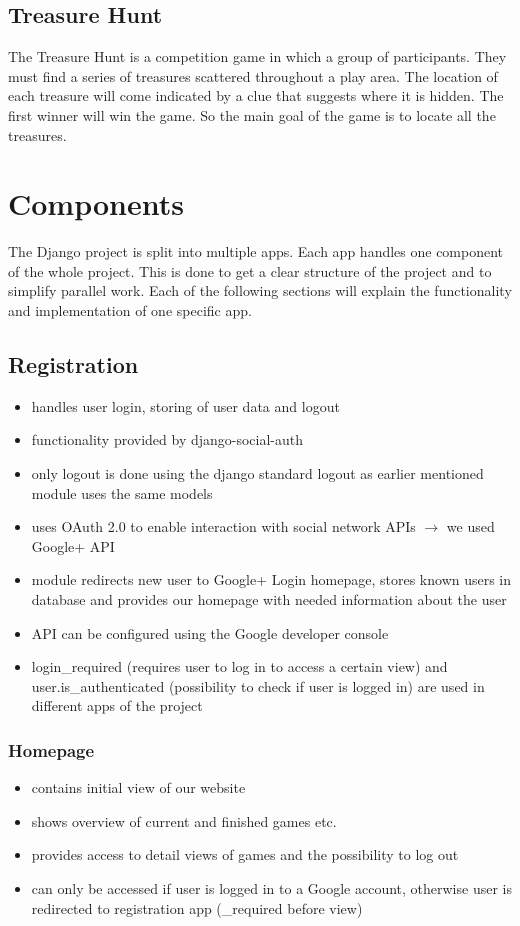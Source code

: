 \documentclass{article}
\begin{document}
\subsection{Treasure Hunt}

The Treasure Hunt is a competition game in which a group of participants. They must find a series of treasures scattered throughout a play area. The location of each treasure will come indicated by a clue that suggests where it is hidden. The first winner will win the game. So the main goal of the game is to locate all the treasures.

\section{Components} %
The Django project is split into multiple apps. Each app handles one component of the whole project. This is done to get a clear structure of the project and to simplify parallel work. Each of the following sections will explain the functionality and implementation of one specific app.
\subsection{Registration}
\begin{itemize}
\item handles user login, storing of user data and logout
\item functionality provided by django-social-auth
\item only logout is done using the django standard logout as earlier mentioned module uses the same models
\item uses OAuth 2.0 to enable interaction with social network APIs $\to$ we used Google+ API
\item module redirects new user to Google+ Login homepage, stores known users in database and provides our homepage with needed information about the user
\item API can be configured using the Google developer console 
\item login\_required (requires user to log in to access a certain view) and user.is\_authenticated (possibility to check if user is logged in) are used in different apps of the project
\end{itemize}
\subsubsection{Homepage}
\begin{itemize}
\item contains initial view of our website
\item shows overview of current and finished games etc.
\item provides access to detail views of games and the possibility to log out
\item can only be accessed if user is logged in to a Google account, otherwise user is redirected to registration app (\@login\_required before view)
\end{itemize}
\end{document}
